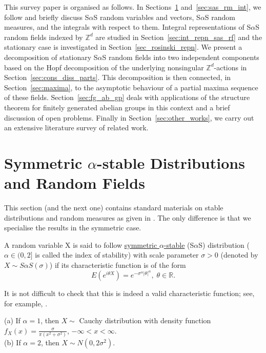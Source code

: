 \documentclass[12pt]{amsart}
\begin{document}
This survey paper is organised as follows. In Sections~\ref{sec:sas_distn} and~\ref{sec:sas_rm_int}, we follow \cite{samorodnitsky:taqqu:1994} and briefly discuss S$\alpha$S random variables and vectors, S$\alpha$S random measures, and the integrals with respect to them. Integral representations of S$\alpha$S random fields indexed by $\mathbb{Z}^d$ are studied in Section~\ref{sec:int_repn_sas_rf} and the stationary case is investigated in Section~\ref{sec_rosinski_repn}. We present a decomposition of stationary S$\alpha$S random fields into two independent components based on the Hopf decomposition of the underlying nonsingular $\mathbb{Z}^d$-actions in Section~\ref{sec:cons_diss_parts}. This decomposition is then connected, in Section~\ref{sec:maxima}, to the asymptotic behaviour of a partial maxima sequence of these fields. Section~\ref{sec:fg_ab_gp} deals with applications of the structure theorem for finitely generated abelian groups in this context and a brief discussion of open problems. Finally in Section~\ref{sec:other_works}, we carry out an extensive literature survey of related work.

\section{Symmetric $\alpha$-stable Distributions and Random Fields} \label{sec:sas_distn}

This section (and the next one) contains standard materials on stable distributions and random measures as given in \cite{samorodnitsky:taqqu:1994}. The only difference is that we specialise the results in the symmetric case.

\begin{defn} A random variable X is said to follow \underline{symmetric $\alpha$-stable} (S$\alpha$S) distribution ($\alpha \in (0, 2]$ is called the index of stability) with scale parameter $\sigma>0$ (denoted by $X \sim S\alpha S(\sigma)$) if its characteristic function is of the form
\[
E(e^{i\theta X})=e^{-\sigma^\alpha |\theta|^\alpha}, \; \theta \in \mathbb{R}.
\]
\end{defn}

It is not difficult to check that this is indeed a valid characteristic function; see, for example, \cite{feller:1971}.

\begin{prop}\label{prop_known_distns}(a) If $\alpha=1$, then $X \sim$ Cauchy distribution with density function $f_X(x)=\frac{\sigma}{\pi(x^2+\sigma^2)}$, $-\infty<x<\infty$.\\
(b) If $\alpha=2$, then $X \sim N(0, 2\sigma^2)$.
\end{prop}
\end{document}
